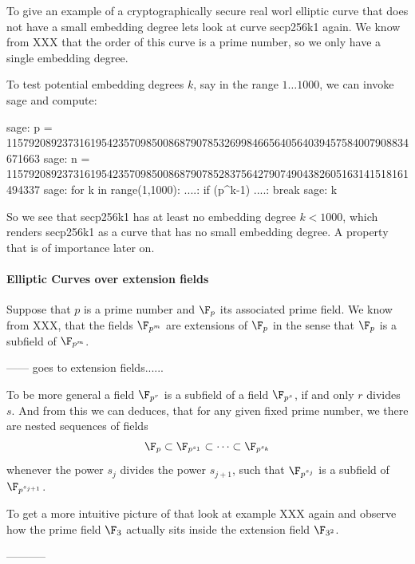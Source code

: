 \begin{example} To give an example of a cryptographically secure real worl elliptic curve that does not have a small embedding degree lets look at curve secp256k1 again. We know from XXX that the order of this curve is a prime number, so we only have a single embedding degree.

To test potential embedding degrees $k$, say in the range $1\ldots 1000$, we can invoke sage and compute:
\begin{sagecommandline}
sage: p = 115792089237316195423570985008687907853269984665640564039457584007908834671663
sage: n = 115792089237316195423570985008687907852837564279074904382605163141518161494337
sage: for k in range(1,1000):
....:     if (p^k-1)%
....:         break
sage: k
\end{sagecommandline}
So we see that secp256k1 has at least no embedding degree $k<1000$, which renders secp256k1 as a curve that has no small embedding degree. A property that is of importance later on.
\end{example}
\paragraph{Elliptic Curves over extension fields} Suppose that $p$ is a prime number and $\F_p$ its associated prime field. We know from XXX, that the fields $\F_{p^m}$ are extensions of $\F_p$ in the sense that $\F_{p}$ is a subfield of $\F_{p^m}$. 




------ goes to extension fields......

To be more general a field $\F_{p^r}$ is a subfield of a field $\F_{p^s}$, if and only $r$ divides $s$. And from this we can deduces, that for any given fixed prime number, we there are nested sequences of fields
\begin{equation}
\F_p \subset \F_{p^{s_1}} \subset \cdots \subset \F_{p^{s_k}}
\end{equation}
whenever the power $s_j$ divides the power $s_{j+1}$, such that $\F_{p^{s_j}}$ is a subfield of $\F_{p^{s_{j+1}}}$. 

To get a more intuitive picture of that look at example XXX again and observe how the prime field $\F_3$ actually sits inside the extension field $\F_{3^2}$. 

-----------

